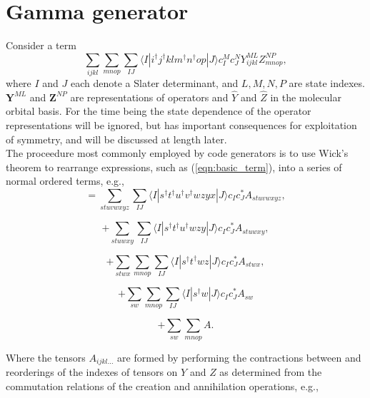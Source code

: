 \documentclass[12pt]{article}
\begin{document}
\section{Gamma generator}
Consider a term
\begin{equation}
\sum_{ijkl}\sum_{mnop} \sum_{IJ} \langle I | i^{\dagger}j^{\dagger}klm^{\dagger}n^{\dagger}op | J \rangle c^{M}_{I} c_{J}^{N} Y^{ML}_{ijkl}Z^{NP}_{mnop},
\label{eqn:basic_term}
\end{equation}
where $I$ and $J$ each denote a Slater determinant, and $L,M,N,P$ are state
indexes.  $\mathbf{Y}^{ML}$ and $\mathbf{Z}^{NP}$ are representations of
operators and $\hat{Y}$ and $\hat{Z}$ in the molecular orbital basis. For the time being
the state dependence of the operator representations will be ignored, but has important consequences
for exploitation of symmetry, and will be discussed at length later. \\ 

\noindent The proceedure most commonly employed by code generators is to use Wick's theorem
to rearrange expressions, such as (\ref{eqn:basic_term}), into a series of normal ordered terms, e.g.,
\begin{equation*}
=\sum_{stuvwxyz} \sum_{IJ} \langle I | s^{\dagger}t^{\dagger}u^{\dagger}v^{\dagger}wzyx | J \rangle c_{I} c^{*}_{J} A_{stuvwxyz},
\end{equation*}

\begin{equation*}
+\sum_{stuwxy} \sum_{IJ} \langle I | s^{\dagger}t^{\dagger}u^{\dagger}wzy | J \rangle c_{I} c^{*}_{J} A_{stuwxy},
\end{equation*}

\begin{equation*}
+\sum_{stwx}\sum_{mnop} \sum_{IJ} \langle I | s^{\dagger}t^{\dagger}wz | J \rangle c_{I} c^{*}_{J} A_{stwx},
\end{equation*}

\begin{equation*}
+\sum_{sw}\sum_{mnop} \sum_{IJ} \langle I | s^{\dagger}w | J \rangle c_{I} c^{*}_{J} A_{sw}
\end{equation*}

\begin{equation*}
+\sum_{sw}\sum_{mnop}  A .
\end{equation*}

\noindent Where the tensors $A_{ijkl...}$ are formed by performing the 
contractions between and reorderings of the indexes of tensors on $Y$ and $Z$ as 
determined from the commutation relations of the creation and annihilation operations, e.g.,
 
\end{document}
